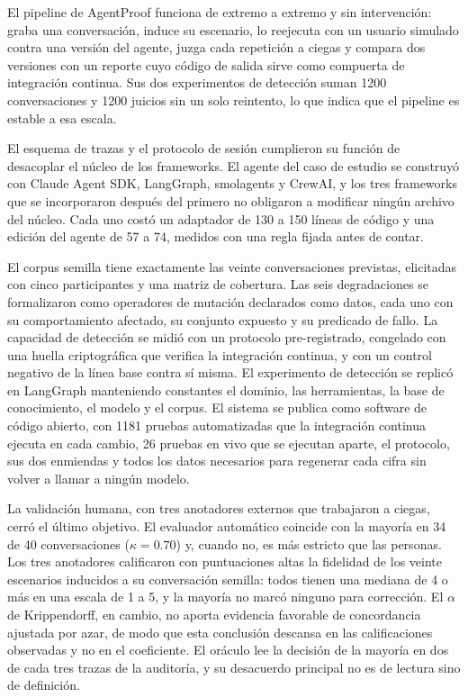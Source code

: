 El pipeline de AgentProof funciona de extremo a extremo y sin intervención: graba una conversación, induce su escenario, lo reejecuta con un usuario simulado contra una versión del agente, juzga cada repetición a ciegas y compara dos versiones con un reporte cuyo código de salida sirve como compuerta de integración continua. Sus dos experimentos de detección suman 1200 conversaciones y 1200 juicios sin un solo reintento, lo que indica que el pipeline es estable a esa escala.
\par
El esquema de trazas y el protocolo de sesión cumplieron su función de desacoplar el núcleo de los frameworks. El agente del caso de estudio se construyó con Claude Agent SDK, LangGraph, smolagents y CrewAI, y los tres frameworks que se incorporaron después del primero no obligaron a modificar ningún archivo del núcleo. Cada uno costó un adaptador de 130 a 150 líneas de código y una edición del agente de 57 a 74, medidos con una regla fijada antes de contar.
\par
El corpus semilla tiene exactamente las veinte conversaciones previstas, elicitadas con cinco participantes y una matriz de cobertura. Las seis degradaciones se formalizaron como operadores de mutación declarados como datos, cada uno con su comportamiento afectado, su conjunto expuesto y su predicado de fallo. La capacidad de detección se midió con un protocolo pre-registrado, congelado con una huella criptográfica que verifica la integración continua, y con un control negativo de la línea base contra sí misma. El experimento de detección se replicó en LangGraph manteniendo constantes el dominio, las herramientas, la base de conocimiento, el modelo y el corpus. El sistema se publica como software de código abierto, con 1181 pruebas automatizadas que la integración continua ejecuta en cada cambio, 26 pruebas en vivo que se ejecutan aparte, el protocolo, sus dos enmiendas y todos los datos necesarios para regenerar cada cifra sin volver a llamar a ningún modelo.
\par
La validación humana, con tres anotadores externos que trabajaron a ciegas, cerró el último objetivo. El evaluador automático coincide con la mayoría en 34 de 40 conversaciones ($\kappa = 0.70$) y, cuando no, es más estricto que las personas. Los tres anotadores calificaron con puntuaciones altas la fidelidad de los veinte escenarios inducidos a su conversación semilla: todos tienen una mediana de 4 o más en una escala de 1 a 5, y la mayoría no marcó ninguno para corrección. El $\alpha$ de Krippendorff, en cambio, no aporta evidencia favorable de concordancia ajustada por azar, de modo que esta conclusión descansa en las calificaciones observadas y no en el coeficiente. El oráculo lee la decisión de la mayoría en dos de cada tres trazas de la auditoría, y su desacuerdo principal no es de lectura sino de definición.
\par

